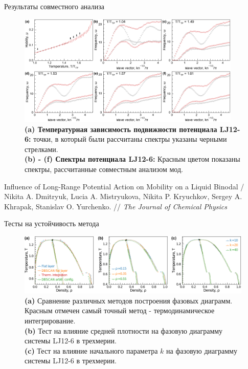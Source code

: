 \documentclass{beamer}
\begin{document}
\begin{frame}{Результаты совместного анализа}
\scriptsize{

\begin{figure}
\centering
 \includegraphics[width=0.95\textwidth]{MACR-Figure4}
 \caption{\scriptsize{\textbf{(a) Температурная зависимость подвижности потенциала LJ12-6:} точки, в который были рассчитаны спектры указаны черными стрелками.\\
 \textbf{(b) - (f) Спектры потенциала LJ12-6:} Красным цветом показаны спектры, рассчитанные совместным анализом мод.}}
\label{Figure4}
\end{figure}

}

\tiny{Influence of Long-Range Potential Action on Mobility on a Liquid Binodal / Nikita A. Dmitryuk, Lucia A. Mistryukova, Nikita P. Kryuchkov, Sergey A. Khrapak, Stanislav O. Yurchenko. // \textit{The Journal of Chemical Physics}}

\end{frame}










\begin{frame}{Тесты на устойчивость метода}
\footnotesize{
\begin{figure}[!t]
    \centering
    \includegraphics[width=\linewidth]{Figure10.pdf}
    \caption{\textbf{(a)} Сравнение различных методов построения фазовых диаграмм. Красным отмечен самый точный метод - термодинамическое интегрирование.\\
             \textbf{(b)} Тест на влияние средней плотности на фазовую диаграмму системы LJ12-6 в трехмерии.\\
             \textbf{(c)} Тест на влияние начального параметра $k$ на фазовую диаграмму системы LJ12-6 в трехмерии.}
    \label{tests}
\end{figure}
}

\end{frame}
\end{document}
